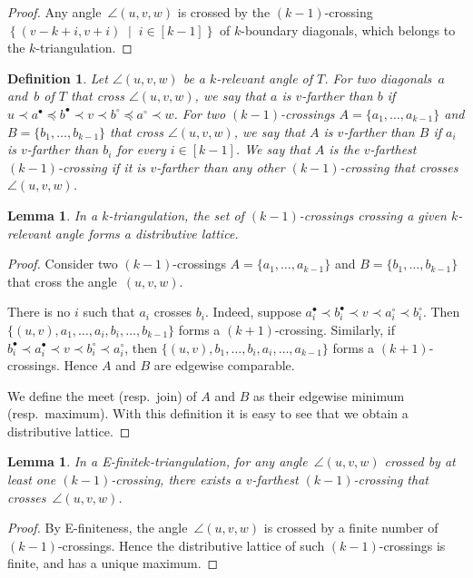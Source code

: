 \documentclass{amsart}
\newtheorem{lemma}[theorem]{Lemma}
\newtheorem{definition}[theorem]{Definition}
\theoremstyle{remark}
\newcommand{\darkblue}{\color{darkblue}} %
\newcommand{\defn}[1]{\textsl{\darkblue #1}} %
\newcommand{\set}[2]{\left\{ #1 \;\middle|\; #2 \right\}} %
\newcommand*{\ef}[0]{E-finite\xspace}
\newcommand*{\ktg}[0]{$k$-triangulation\xspace}
\newcommand{\cl}{\prec}
\newcommand{\cle}{\preccurlyeq}
\begin{document}
\begin{proof}
Any angle~$\angle(u,v,w)$ is crossed by the $(k-1)$-crossing~$\set{(v-k+i, v+i)}{i \in [k-1]}$ of $k$-boundary diagonals, which belongs to the \ktg.
\end{proof}

\begin{definition}
Let $\angle(u,v,w)$ be a $k$-relevant angle of $T$.
For two diagonals~$a$ and~$b$ of $T$ that cross $\angle(u,v,w)$, we say that $a$ is \defn{$v$-farther} than $b$ if $u \cl a^\bullet \cle b^\bullet \cl v \cl b^\circ \cle a^\circ \cl w$. For two $(k-1)$-crossings $A = \{a_1, \dots, a_{k-1}\}$ and $B = \{b_1, \dots, b_{k-1}\}$ that cross $\angle(u,v,w)$, we say that $A$ is \defn{$v$-farther} than $B$ if $a_i$ is $v$-farther than $b_i$ for every $i \in [k-1]$. We say that $A$ is the \defn{$v$-farthest} $(k-1)$-crossing if it is $v$-farther than any other $(k-1)$-crossing that crosses~$\angle(u,v,w)$.
\end{definition}

\begin{lemma}
In a \ktg, the set of $(k-1)$-crossings crossing a given $k$-relevant angle forms a distributive lattice.
\end{lemma}

\begin{proof}
Consider two $(k-1)$-crossings $A = \{a_1, \dots, a_{k-1}\}$ and $B = \{b_1, \dots, b_{k-1}\}$ that cross the angle~$(u,v,w)$.

There is no $i$ such that $a_i$ crosses $b_i$. 
Indeed, suppose $a^\bullet_i \cl b^\bullet_i \cl v \cl a^\circ_i \cl b^\circ_i$. Then $\{(u, v), a_1, \dots, a_i, b_i, \dots, b_{k-1}\}$ forms a $(k+1)$-crossing. 
Similarly, if $b^\bullet_i \cl a^\bullet_i \cl v \cl b^\circ_i \cl a^\circ_i$, then $\{(u, v), b_1, \dots, b_i, a_i, \dots, a_{k-1}\}$ forms a $(k+1)$-crossings.
Hence $A$ and $B$ are edgewise comparable.

We define the meet (resp.~join) of $A$ and $B$ as their edgewise minimum (resp.~maximum). With this definition it is easy to see that we obtain a distributive lattice.
\end{proof}

\begin{lemma}
\label{lem:efMax}
In a \ef \ktg, for any angle~$\angle(u,v,w)$ crossed by at least one $(k-1)$-crossing, there exists a $v$-farthest $(k-1)$-crossing that crosses~$\angle(u,v,w)$.
\end{lemma}

\begin{proof}
By \ef{}ness, the angle~$\angle(u,v,w)$ is crossed by a finite number of $(k-1)$-crossings. Hence the distributive lattice of such $(k-1)$-crossings is finite, and has a unique maximum.
\end{proof}
\end{document}
